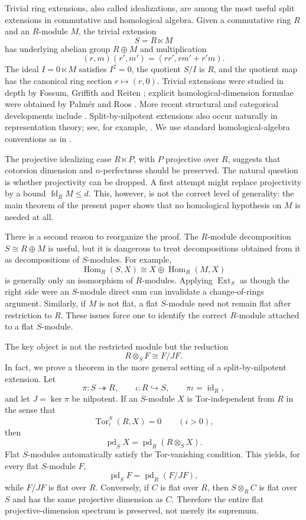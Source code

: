 \documentclass[11pt,reqno]{amsart}
\newcommand{\pd}{\operatorname{pd}}
\newcommand{\fd}{\operatorname{fd}}
\newcommand{\Tor}{\operatorname{Tor}}
\newcommand{\Ext}{\operatorname{Ext}}
\newcommand{\id}{\operatorname{id}}
\theoremstyle{plain}
\theoremstyle{definition}
\theoremstyle{remark}
\begin{document}
Trivial ring extensions, also called idealizations, are among the most useful
split extensions in commutative and homological algebra.  Given a commutative ring
$R$ and an $R$-module $M$, the trivial extension
\[
   S=R\ltimes M
\]
has underlying abelian group $R\oplus M$ and multiplication
\[
   (r,m)(r',m')=(rr',rm'+r'm).
\]
The ideal $I=0\ltimes M$ satisfies $I^2=0$, the quotient $S/I$ is $R$, and the
quotient map has the canonical ring section $r\mapsto(r,0)$.  Trivial extensions
were studied in depth by Fossum, Griffith and Reiten
\cite{FossumGriffithReiten1975}; explicit homological-dimension formulae were
obtained by Palm\'er and Roos \cite{PalmerRoos1973}.  More recent structural and
categorical developments include \cite{AndersonEtAl2017,Beligiannis2000,
BenkhadraBennisGarcia2020}.  Split-by-nilpotent extensions also occur naturally in representation theory; see, for example, \cite{AssemMarmaridis1998,AssemZacharia2003}.  We use standard homological-algebra conventions as in
\cite{Rotman2009,Weibel1994}.

The projective idealizing case $R\ltimes P$, with $P$ projective over $R$, suggests
that cotorsion dimension and $n$-perfectness should be preserved.  The natural
question is whether projectivity can be dropped.  A first attempt might replace
projectivity by a bound $\fd_RM\le d$.  This, however, is not the correct level of
generality: the main theorem of the present paper shows that no homological
hypothesis on $M$ is needed at all.

There is a second reason to reorganize the proof.  The $R$-module decomposition
$S\cong R\oplus M$ is useful, but it is dangerous to treat decompositions obtained
from it as decompositions of $S$-modules.  For example,
\[
  \operatorname{Hom}_R(S,X)
  \cong X\oplus\operatorname{Hom}_R(M,X)
\]
is generally only an isomorphism of $R$-modules.  Applying $\Ext_S$ as though the
right side were an $S$-module direct sum can invalidate a change-of-rings argument.
Similarly, if $M$ is not flat, a flat $S$-module need not remain flat after
restriction to $R$.  These issues force one to identify the correct $R$-module
attached to a flat $S$-module.

The key object is not the restricted module but the reduction
\[
  R\otimes_SF\cong F/JF.
\]
In fact, we prove a theorem in the more general setting of a split-by-nilpotent
extension.  Let
\[
  \pi:S\twoheadrightarrow R,
  \qquad \iota:R\hookrightarrow S,
  \qquad \pi\iota=\id_R,
\]
and let $J=\ker\pi$ be nilpotent.  If an $S$-module $X$ is Tor-independent from
$R$ in the sense that
\[
  \Tor_i^S(R,X)=0\qquad(i>0),
\]
then
\[
  \pd_SX=\pd_R(R\otimes_SX).
\]
Flat $S$-modules automatically satisfy the Tor-vanishing condition.  This yields,
for every flat $S$-module $F$,
\[
  \pd_SF=\pd_R(F/JF),
\]
while $F/JF$ is flat over $R$.  Conversely, if $C$ is flat over $R$, then
$S\otimes_RC$ is flat over $S$ and has the same projective dimension as $C$.
Therefore the entire flat projective-dimension spectrum is preserved, not merely
its supremum.
\end{document}
